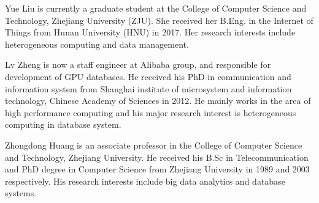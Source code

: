 \documentclass[10pt,journal,compsoc]{IEEEtran}
\begin{document}
\begin{IEEEbiography}
	{Yue Liu} is currently a graduate student at the College of Computer Science and Technology, Zhejiang University (ZJU). She received her B.Eng. in the Internet of Things from Hunan University (HNU) in 2017. Her research interests include heterogeneous computing and data management.
\end{IEEEbiography}
\vspace*{-2\baselineskip}

\begin{IEEEbiography}
	{Lv Zheng} is now a staff engineer at Alibaba group, and responsible for development of GPU databases. He received his PhD in communication and information system from Shanghai institute of microsystem and information technology, Chinese Academy of Sciences in 2012. He mainly works in the area of high performance computing and his major research interest is heterogeneous computing in database system.
\end{IEEEbiography}
\vspace*{-2\baselineskip}

\begin{IEEEbiography}
	{Zhongdong Huang} is an associate professor in the College of Computer Science and Technology, Zhejiang University. He received his B.Sc in Telecommunication and PhD degree in Computer Science from Zhejiang University in 1989 and 2003 respectively. His research interests include big data analytics and database systems.
\end{IEEEbiography}
\vspace*{-2\baselineskip}
\end{document}
